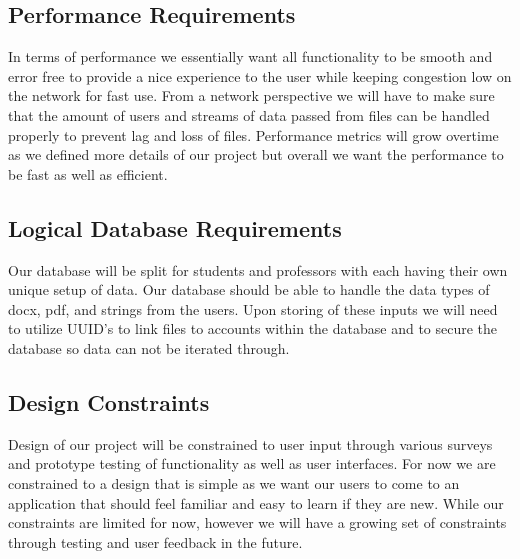 \documentclass[onecolumn, draftclsnofoot,10pt, compsoc]{IEEEtran}
\begin{document}
\subsection{Performance Requirements}
In terms of performance we essentially want all functionality to be smooth and error free to provide a nice experience to the user while keeping congestion low on the network for fast use. From a network perspective we will have to make sure that the amount of users and streams of data passed from files can be handled properly to prevent lag and loss of files. Performance metrics will grow overtime as we defined more details of our project but overall we want the performance to be fast as well as efficient. 

\subsection{Logical Database Requirements}
Our database will be split for students and professors with each having their own unique setup of data. Our database should be able to handle the data types of docx, pdf, and strings from the users. Upon storing of these inputs we will need to utilize UUID's to link files to accounts within the database and to secure the database so data can not be iterated through. 

\subsection{Design Constraints}
Design of our project will be constrained to user input through various surveys and prototype testing of functionality  as well as user interfaces. For now we are constrained to a design that is simple as we want our users to come to an application that should feel familiar and easy to learn if they are new. While our constraints are limited for now, however we will have a growing set of constraints through testing and user feedback in the future.    
\end{document}
